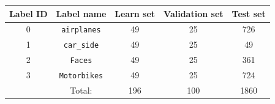 \documentclass[a4paper,11pt,oneside]{article}
\begin{document}
\begin{center}
 \begin{tabular}{c c c c c}
 \hline
 Label ID & Label name & Learn set & Validation set & Test set \\ [0.5ex]
 \hline\hline
 0 & \lstinline!airplanes! & 49 & 25 & 726 \\
 \hline
 1 & \lstinline!car_side! & 49 & 25 & 49 \\
 \hline
 2 & \lstinline!Faces! & 49 & 25 & 361 \\
 \hline
 3 & \lstinline!Motorbikes! & 49 & 25 & 724 \\
 \hline\hline
  & Total: & 196 & 100 & 1860 \\
 \hline
\end{tabular}
\end{center}
\end{document}
